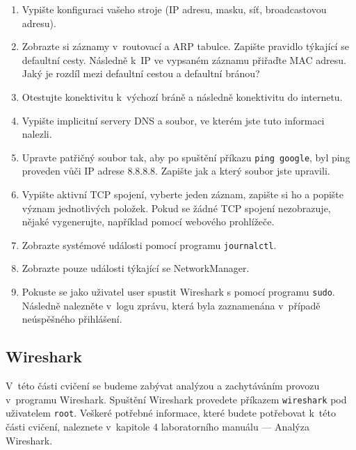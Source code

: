 \begin{enumerate}
\item Vypište konfiguraci vašeho stroje (IP adresu, masku, síť, broadcastovou adresu).
\item Zobrazte si záznamy v~routovací a ARP tabulce. Zapište pravidlo týkající se defaultní cesty. Následně k~IP ve vypsaném záznamu přiřaďte MAC adresu. Jaký je rozdíl mezi defaultní cestou a defaultní bránou?
\item Otestujte konektivitu k~výchozí bráně a následně konektivitu do internetu.
\item Vypište implicitní servery DNS a soubor, ve kterém jste tuto informaci nalezli.
\item Upravte patřičný soubor tak, aby po spuštění příkazu \texttt{ping google}, byl ping proveden vůči IP adrese 8.8.8.8. Zapište jak a který soubor jste upravili.
\item Vypište aktivní TCP spojení, vyberte jeden záznam, zapište si ho a popište význam jednotlivých položek. Pokud se žádné TCP spojení nezobrazuje, nějaké vygenerujte, například pomocí webového prohlížeče.
\item Zobrazte systémové události pomocí programu \texttt{journalctl}.
\item Zobrazte pouze události týkající se NetworkManager.
\item Pokuste se jako uživatel user spustit Wireshark s pomocí programu \texttt{sudo}. Následně nalezněte v~logu zprávu, která byla zaznamenána v~případě neúspěšného přihlášení.
\end{enumerate}

\subsection{Wireshark}
V~této části cvičení se budeme zabývat analýzou a zachytáváním provozu
v~programu Wireshark. Spuštění Wireshark provedete příkazem \texttt{wireshark}
pod uživatelem \texttt{root}. Veškeré potřebné informace, které budete
potřebovat k~této části cvičení, naleznete v~kapitole 4 laboratorního manuálu
--- Analýza Wireshark.

